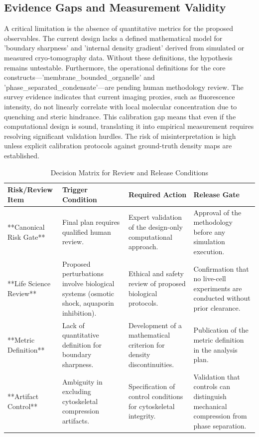 \documentclass[conference]{IEEEtran}
\begin{document}
\subsection{Evidence Gaps and Measurement Validity}
A critical limitation is the absence of quantitative metrics for the proposed observables. The current design lacks a defined mathematical model for 'boundary sharpness' and 'internal density gradient' derived from simulated or measured cryo-tomography data. Without these definitions, the hypothesis remains untestable. Furthermore, the operational definitions for the core constructs---'membrane\_bounded\_organelle' and 'phase\_separated\_condensate'---are pending human methodology review. The survey evidence indicates that current imaging proxies, such as fluorescence intensity, do not linearly correlate with local molecular concentration due to quenching and steric hindrance. This calibration gap means that even if the computational design is sound, translating it into empirical measurement requires resolving significant validation hurdles. The risk of misinterpretation is high unless explicit calibration protocols against ground-truth density maps are established.

\begin{table}[htbp]
\centering
\footnotesize
\setlength{\tabcolsep}{3pt}
\renewcommand{\arraystretch}{1.12}
\caption{Decision Matrix for Review and Release Conditions}
\label{tab:risk-limitations-and-review-block-3}
\begin{tabular}{|p{}|p{}|p{}|p{}|}
\hline
Risk/Review Item & Trigger Condition & Required Action & Release Gate \\\hline
**Canonical Risk Gate** & Final plan requires qualified human review. & Expert validation of the design-only computational approach. & Approval of the methodology before any simulation execution. \\\hline
**Life Science Review** & Proposed perturbations involve biological systems (osmotic shock, aquaporin inhibition). & Ethical and safety review of proposed biological protocols. & Confirmation that no live-cell experiments are conducted without prior clearance. \\\hline
**Metric Definition** & Lack of quantitative definition for boundary sharpness. & Development of a mathematical criterion for density discontinuities. & Publication of the metric definition in the analysis plan. \\\hline
**Artifact Control** & Ambiguity in excluding cytoskeletal compression artifacts. & Specification of control conditions for cytoskeletal integrity. & Validation that controls can distinguish mechanical compression from phase separation. \\\hline
\end{tabular}
\end{table}~\cite{cite_9ae4c49700eea560,cite_e2b5e3dbdb69d6a2}
\end{document}
